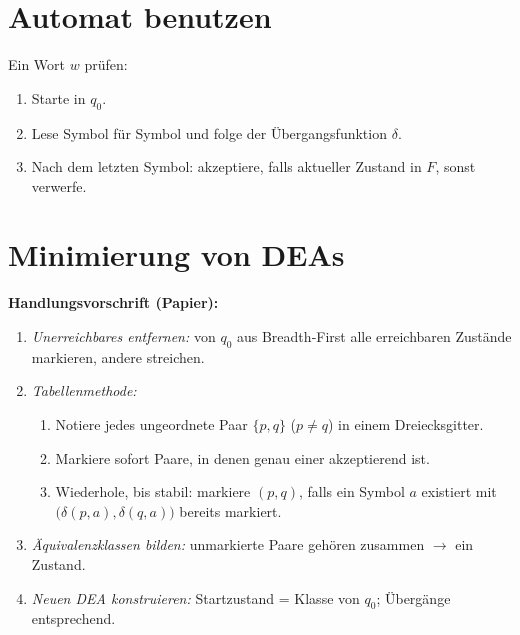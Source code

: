 \section{Automat benutzen}
Ein Wort $w$ prüfen:
\begin{enumerate}
  \item Starte in $q_0$.
  \item Lese Symbol für Symbol und folge der Übergangsfunktion $\delta$.
  \item Nach dem letzten Symbol: akzeptiere, falls aktueller Zustand in $F$, sonst verwerfe.
\end{enumerate}

\section{Minimierung von DEAs}\label{sec:min-dea}
\textbf{Handlungsvorschrift (Papier):}
\begin{enumerate}
  \item \textit{Unerreichbares entfernen:} von $q_0$ aus Breadth‑First alle erreichbaren Zustände markieren, andere streichen.
  \item \textit{Tabellenmethode:}
    \begin{enumerate}
      \item Notiere jedes ungeordnete Paar $\{p,q\}$ ($p\neq q$) in einem Dreiecksgitter.
      \item Markiere sofort Paare, in denen genau einer akzeptierend ist.
      \item Wiederhole, bis stabil: markiere $(p,q)$, falls ein Symbol $a$ existiert mit $\bigl(\delta(p,a),\delta(q,a)\bigr)$ bereits markiert.
    \end{enumerate}
  \item \textit{Äquivalenzklassen bilden:} unmarkierte Paare gehören zusammen $\to$ ein Zustand.
  \item \textit{Neuen DEA konstruieren:} Startzustand = Klasse von $q_0$; Übergänge entsprechend.
\end{enumerate}

